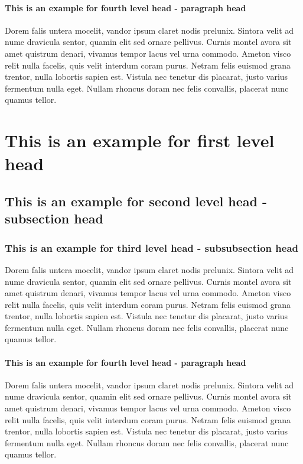 \documentclass[namedate,webpdf,contemporary,large]{TBench-template}%
\theoremstyle{thmstyleone}%
\theoremstyle{thmstyletwo}%
\theoremstyle{thmstylethree}%
\begin{document}
\paragraph{This is an example for fourth level head - paragraph head}

Dorem falis untera mocelit, vandor ipsum claret nodis prelunix. Sintora velit ad nume dravicula sentor, quamin elit sed ornare pellivus. Curnis montel avora sit amet quistrum denari, vivamus tempor lacus vel urna commodo. Ameton visco relit nulla facelis, quis velit interdum coram purus. Netram felis euismod grana trentor, nulla lobortis sapien est. Vistula nec tenetur dis placarat, justo varius fermentum nulla eget. Nullam rhoncus doram nec felis convallis, placerat nunc quamus tellor.

\section{This is an example for first level head}\label{sec3}

\subsection{This is an example for second level head - subsection head}\label{subsec2}

\subsubsection{This is an example for third level head - subsubsection head}\label{subsubsec2}

Dorem falis untera mocelit, vandor ipsum claret nodis prelunix. Sintora velit ad nume dravicula sentor, quamin elit sed ornare pellivus. Curnis montel avora sit amet quistrum denari, vivamus tempor lacus vel urna commodo. Ameton visco relit nulla facelis, quis velit interdum coram purus. Netram felis euismod grana trentor, nulla lobortis sapien est. Vistula nec tenetur dis placarat, justo varius fermentum nulla eget. Nullam rhoncus doram nec felis convallis, placerat nunc quamus tellor.

\paragraph{This is an example for fourth level head - paragraph head}

Dorem falis untera mocelit, vandor ipsum claret nodis prelunix. Sintora velit ad nume dravicula sentor, quamin elit sed ornare pellivus. Curnis montel avora sit amet quistrum denari, vivamus tempor lacus vel urna commodo. Ameton visco relit nulla facelis, quis velit interdum coram purus. Netram felis euismod grana trentor, nulla lobortis sapien est. Vistula nec tenetur dis placarat, justo varius fermentum nulla eget. Nullam rhoncus doram nec felis convallis, placerat nunc quamus tellor.
\end{document}

